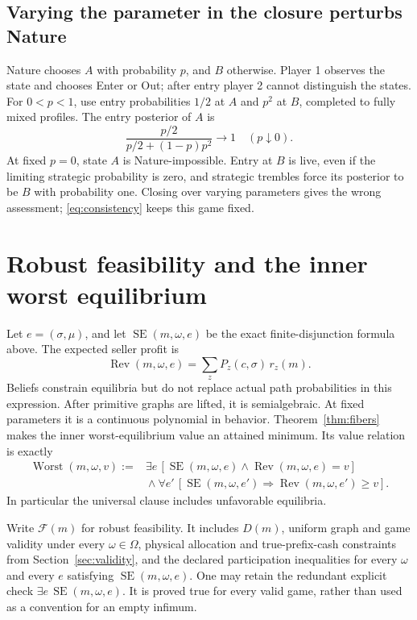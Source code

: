 \documentclass[11pt,a4paper]{article}
\numberwithin{equation}{section}
\theoremstyle{definition}
\DeclareMathOperator{\SE}{SE}
\DeclareMathOperator{\Rev}{Rev}
\begin{document}
\subsection{Varying the parameter in the closure perturbs Nature}
Nature chooses \(A\) with probability \(p\), and \(B\) otherwise.
Player 1 observes the state and chooses Enter or Out; after entry
player 2 cannot distinguish the states.
For \(0<p<1\), use entry probabilities \(1/2\) at \(A\) and \(p^2\)
at \(B\), completed to fully mixed profiles.
The entry posterior of \(A\) is
\[
 \frac{p/2}{p/2+(1-p)p^2}\longrightarrow1\quad(p\downarrow0).
\]
At fixed \(p=0\), state \(A\) is Nature-impossible.
Entry at \(B\) is live, even if the limiting strategic probability
is zero, and strategic trembles force its posterior to be \(B\)
with probability one.
Closing over varying parameters gives the wrong assessment;
\eqref{eq:consistency} keeps this game fixed.

\section{Robust feasibility and the inner worst equilibrium}\label{sec:feasible}
Let \(e=(\sigma,\mu)\), and let \(\SE(m,\omega,e)\) be the exact
finite-disjunction formula above.
The expected seller profit is
\begin{equation}\label{eq:revenue}
 \Rev(m,\omega,e)=\sum_z P_z(c,\sigma)\,r_z(m).
\end{equation}
Beliefs constrain equilibria but do not replace actual path
probabilities in this expression.
After primitive graphs are lifted, it is semialgebraic.
At fixed parameters it is a continuous polynomial in behavior.
Theorem~\ref{thm:fibers} makes the inner worst-equilibrium value an
attained minimum. Its value relation is exactly
\begin{equation}\label{eq:worstfixed}
 \begin{split}
 \operatorname{Worst}(m,\omega,v):={}&
 \exists e\,[\SE(m,\omega,e)\wedge\Rev(m,\omega,e)=v]\\
 &{}\wedge
 \forall e'\,[\SE(m,\omega,e')\Rightarrow
                           \Rev(m,\omega,e')\ge v].
 \end{split}
\end{equation}
In particular the universal clause includes unfavorable equilibria.

Write \(\mathcal F(m)\) for robust feasibility.
It includes \(D(m)\), uniform graph and game validity under every
\(\omega\in\Omega\), physical allocation and true-prefix-cash
constraints from Section~\ref{sec:validity}, and the declared
participation inequalities for every \(\omega\) and every \(e\)
satisfying \(\SE(m,\omega,e)\).
One may retain the redundant explicit check
\(\exists e\,\SE(m,\omega,e)\).
It is proved true for every valid game, rather than used as a convention
for an empty infimum.
\end{document}
